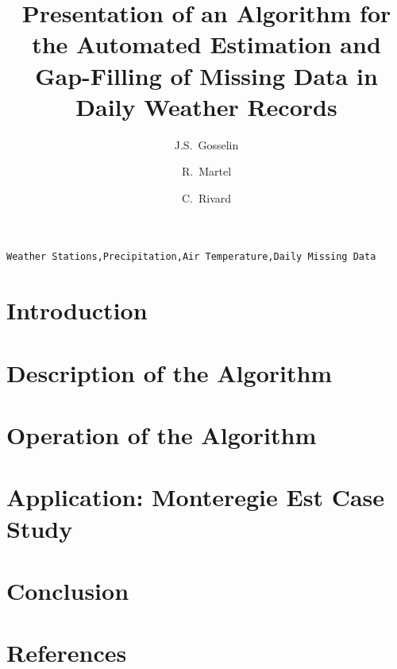 \documentclass[3p, times, review]{elsarticle} %
\begin{document}
\begin{frontmatter}

\title{Presentation of an Algorithm for the Automated Estimation and Gap-Filling of Missing Data in Daily Weather Records}

\author[inrs]{J.S.~Gosselin}

\author[inrs]{R.~Martel}

\author[cgc]{C.~Rivard}


\address[inrs]{Institut national de la recherche scientifique, Centre Eau Terre Environnement,
490 rue de la Couronne, Quebec City, Quebec, Canada}
\address[cgc]{Geological Survey of Canada, Quebec Division, 490 rue de la Couronne, Quebec City, Quebec, Canada}

\begin{abstract}
	\vspace{-1em}
	
\end{abstract}

\begin{keyword}
\texttt{Weather Stations\sep Precipitation\sep Air Temperature\sep Daily Missing Data}
\end{keyword}

\end{frontmatter}

\linenumbers

\section{Introduction}
    

\section{Description of the Algorithm}\label{sec:Theory}
    
    
\section{Operation of the Algorithm}\label{sec:Howto}
    
    
\section{Application: Monteregie Est Case Study}\label{sec:MontEstCaseStudy}
    

\section{Conclusion}
    

\clearpage

\section*{References}
    

\clearpage
\appendix
\section{}\label{appendix}
    
     
\end{document}
